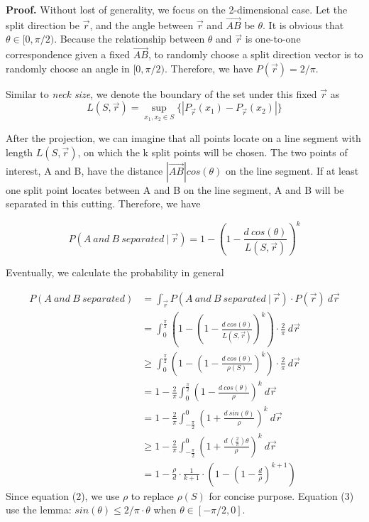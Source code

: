 \textbf{Proof.} Without lost of generality, we focus on the 2-dimensional case. Let the split direction be $\vec{r}$, and the angle between $\vec{r}$ and $\vec{AB}$ be $\theta$. It is obvious that $\theta \in [0, \pi/2)$. Because the relationship between $\theta$ and $\vec{r}$ is one-to-one correspondence given a fixed $\vec{AB}$, to randomly choose a split direction vector is to randomly choose an angle in $[0, \pi/2)$. Therefore, we have $P(\vec{r}) = 2/\pi$.

Similar to \textit{neck size}, we denote the boundary of the set under this fixed $\vec{r}$ as
\begin{equation}
\nonumber
    L(S, \vec{r}) = \sup_{x_1, x_2 \in S}\{|P_{\vec{r}}(x_1) - P_{\vec{r}}(x_2)|\}
\end{equation}

After the projection, we can imagine that all points locate on a line segment with length $L(S, \vec{r})$, on which the k split points will be chosen. The two points of interest, A and B, have the distance $|\vec{AB}|cos(\theta)$ on the line segment. If at least one split point locates between A and B on the line segment, A and B will be separated in this cutting. Therefore, we have

\begin{equation}
\nonumber
    P(A\ and\ B\ separated\ |\ \vec{r}) = 1 - (1 - \frac{d\ cos(\theta)}{L(S, \vec{r})})^{k}
\end{equation}

Eventually, we calculate the probability in general

\begin{align}
\nonumber
    P(A\ and\ B\ separated) & = \int_{\vec{r}} P(A\ and\ B\ separated\ |\ \vec{r}) \cdot P(\vec{r}) \ d\vec{r}\\
\nonumber
    & = \int_{0}^{\frac{\pi}{2}} (1 - (1 - \frac{d\ cos(\theta)}{L(S, \vec{r})})^{k}) \cdot \frac{2}{\pi} \ d\vec{r}\\
\nonumber
    & \ge \int_{0}^{\frac{\pi}{2}} (1 - (1 - \frac{d\ cos(\theta)}{\rho(S)})^{k}) \cdot \frac{2}{\pi} \ d\vec{r}\\
    & = 1 - \frac{2}{\pi} \int_{0}^{\frac{\pi}{2}} (1 - \frac{d\ cos(\theta)}{\rho})^{k} \ d\vec{r}\\
\nonumber
    & = 1 - \frac{2}{\pi} \int_{-\frac{\pi}{2}}^{0} (1 + \frac{d\ sin(\theta)}{\rho})^{k} \ d\vec{r}\\
    & \ge 1 - \frac{2}{\pi} \int_{-\frac{\pi}{2}}^{0} (1 + \frac{d\ (\frac{2}{\pi}) \theta}{\rho})^{k} \ d\vec{r}\\
\nonumber
    & = 1 - \frac{\rho}{d} \cdot \frac{1}{k+1} \cdot (1 - (1 - \frac{d}{\rho})^{k+1})
\end{align}
Since equation (2), we use $\rho$ to replace $\rho(S)$ for concise purpose. Equation (3) use the lemma: $sin(\theta) \le 2/\pi \cdot \theta$ when $\theta \in [-\pi/2, 0]$.
